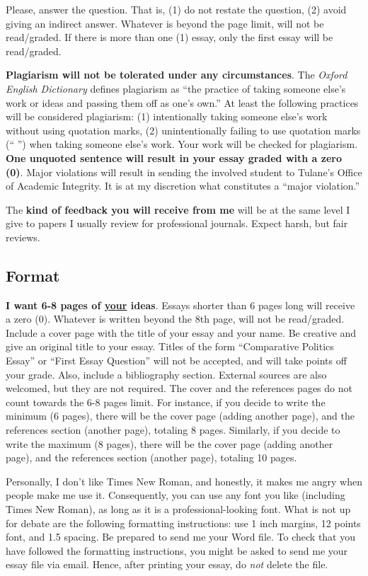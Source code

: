 \documentclass{article}
\begin{document}
Please, answer the question. That is, (1) do not restate the question, (2) avoid giving an indirect answer. Whatever is beyond the page limit, will not be read/graded. If there is more than one (1) essay, only the first essay will be read/graded.

{\bf Plagiarism will not be tolerated under any circumstances}. The \emph{Oxford English Dictionary} defines plagiarism as ``the practice of taking someone else's work or ideas and passing them off as one's own.'' At least the following practices will be considered plagiarism: (1) intentionally taking someone else's work without using quotation marks, (2) unintentionally failing to use quotation marks (`` '') when taking someone else's work. Your work will be checked for plagiarism. {\bf One unquoted sentence will result in your essay graded with a zero (0)}. Major violations will result in sending the involved student to Tulane's Office of Academic Integrity. It is at my discretion what constitutes a ``major violation.''

The {\bf kind of feedback you will receive from me} will be at the same level I give to papers I usually review for professional journals. Expect harsh, but fair reviews.

\subsection*{Format}

{\bf I want 6-8 pages of \underline{your} ideas}. Essays shorter than 6 pages long will receive a zero (0). Whatever is written beyond the 8th page, will not be read/graded. Include a cover page with the title of your essay and your name. Be creative and give an original title to your essay. Titles of the form ``Comparative Politics Essay'' or ``First Essay Question'' will not be accepted, and will take points off your grade. Also, include a bibliography section. External sources are also welcomed, but they are not required. The cover and the references pages do not count towards the 6-8 pages limit. For instance, if you decide to write the minimum (6 pages), there will be the cover page (adding another page), and the references section (another page), totaling 8 pages. Similarly, if you decide to write the maximum (8 pages), there will be the cover page (adding another page), and the references section (another page), totaling 10 pages.

Personally, I don't like Times New Roman, and honestly, it makes me angry when people make me use it. Consequently, you can use any font you like (including Times New Roman), as long as it is a professional-looking font. What is not up for debate are the following formatting instructions: use 1 inch margins, 12 points font, and 1.5 spacing. Be prepared to send me your Word file. To check that you have followed the formatting instructions, you might be asked to send me your essay file via email. Hence, after printing your essay, do \emph{not} delete the file. 
\end{document}
